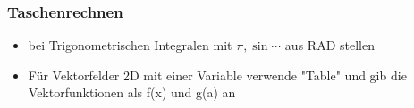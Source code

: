 \subsubsection{Taschenrechnen}
\begin{itemize}
    \item bei Trigonometrischen Integralen mit $\pi, \sin \cdots$ aus RAD stellen
    \item Für Vektorfelder 2D mit einer Variable verwende "Table" und gib die Vektorfunktionen als f(x) und g(a) an
\end{itemize}